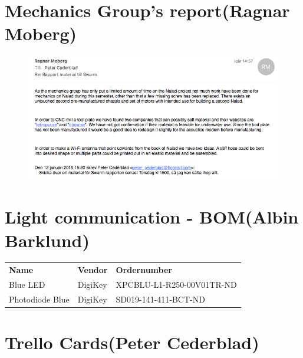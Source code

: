 \newpage
\section{Mechanics Group's report(Ragnar Moberg)} \label{App:MechanicsReport}
\begin{figure}[!htbp]
\centering  
    \includegraphics[scale=0.7]{Mechanics_Report}
        \label{fig:M_R}
\end{figure}





\newpage
\section{Light communication - BOM(Albin Barklund)}\label{App:LightCommunicationBOM}
\begin{tabular}{l l l}
{\bf Name} & {\bf Vendor} & {\bf Ordernumber}\\
Blue LED & DigiKey & XPCBLU-L1-R250-00V01TR-ND \\
Photodiode Blue & DigiKey & SD019-141-411-BCT-ND\\
\end{tabular}


\section{Trello Cards(Peter Cederblad)}



\newpage
